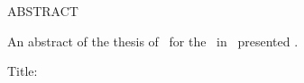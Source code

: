 \begin{center}
ABSTRACT
\end{center}
 
\noindent
An abstract of the thesis of \thesisAuthor~for the \thesisDegree~in 
\thesisDept~presented \thesisDate.
     
\vspace{15mm}
     
\begin{hangparas}{20mm}{1}
    Title: \thesisTitle
\end{hangparas}

\vspace{15mm}
\thesisAbstract
